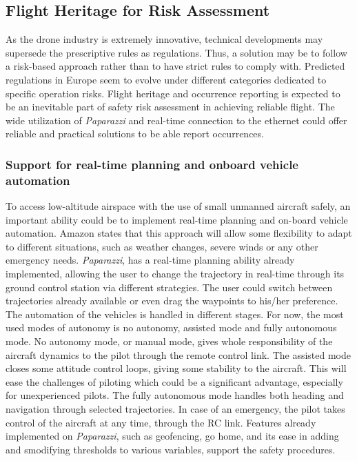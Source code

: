 \subsection{Flight Heritage for Risk Assessment}

As the drone industry is extremely innovative, technical developments may supersede the prescriptive rules as regulations. Thus, a solution may be to follow a risk-based approach rather than to have strict rules to comply with. Predicted regulations in Europe seem to evolve under different categories dedicated to specific operation risks. Flight heritage and occurrence reporting is expected to be an inevitable part of safety risk assessment in achieving reliable flight. The wide utilization of \emph{Paparazzi} and real-time connection to the ethernet could offer reliable and practical solutions to be able report occurrences.  

\subsubsection{Support for real-time planning and onboard vehicle automation}
To access low-altitude airspace with the use of small unmanned aircraft safely, an important ability could be to implement real-time planning and on-board vehicle automation. Amazon states that this approach will allow some flexibility to adapt to different situations, such as weather changes, severe winds or any other emergency needs. \emph{Paparazzi}, has a real-time planning ability already implemented, allowing the user to change the trajectory in real-time through its ground control station via different strategies. The user could switch between trajectories already available or even drag the waypoints to his/her preference. The automation of the vehicles is handled in different stages. For now, the most used modes of autonomy is no autonomy, assisted mode and fully autonomous mode. No autonomy mode, or manual mode, gives whole responsibility of the aircraft dynamics to the pilot through the remote control link.  The assisted mode closes some attitude control loops, giving some stability to the aircraft. This will ease the challenges of piloting which could be a significant advantage, especially for unexperienced pilots. The fully autonomous mode handles both heading and navigation through selected trajectories. In case of an emergency, the pilot takes control of the aircraft at any time, through the RC link. Features already implemented on \emph{Paparazzi}, such as geofencing, go home, and its ease in adding and smodifying thresholds to various variables, support the safety procedures.

